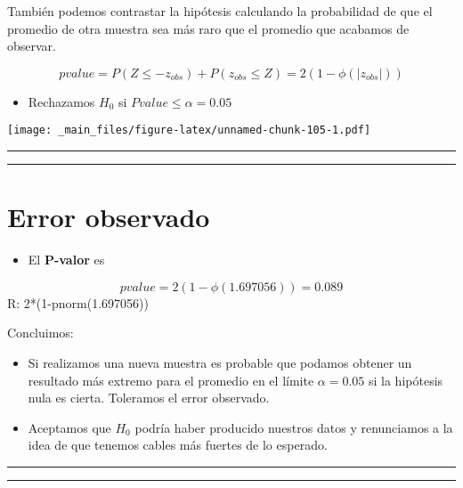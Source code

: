 \documentclass[
]{book}
\providecommand{\tightlist}{%
  \setlength{\itemsep}{0pt}\setlength{\parskip}{0pt}}
\begin{document}
También podemos contrastar la hipótesis calculando la probabilidad de que el promedio de otra muestra sea más raro que el promedio que acabamos de observar.

\[pvalue = P(Z \leq -z_{obs}) + P(z_{obs} \leq Z) = 2 (1-\phi(|z_{obs}|))\]

\begin{itemize}
\tightlist
\item
  Rechazamos \(H_0\) si \(Pvalue \leq \alpha =0.05\)
\end{itemize}

\texttt{[image: \_main\_files/figure-latex/unnamed-chunk-105-1.pdf]}

\begin{center}\rule{0.5\linewidth}{0.5pt}\end{center}

\begin{center}\rule{0.5\linewidth}{0.5pt}\end{center}

\hypertarget{error-observado}{%
\section{Error observado}\label{error-observado}}

\begin{itemize}
\tightlist
\item
  El \textbf{P-valor} es
\end{itemize}

\[pvalue=2 (1-\phi(1.697056))=0.089\]
R: 2*(1-pnorm(1.697056))

Concluimos:

\begin{itemize}
\item
  Si realizamos una nueva muestra es probable que podamos obtener un resultado más extremo para el promedio en el límite \(\alpha=0.05\) si la hipótesis nula es cierta. Toleramos el error observado.
\item
  Aceptamos que \(H_0\) podría haber producido nuestros datos y renunciamos a la idea de que tenemos cables más fuertes de lo esperado.
\end{itemize}

\begin{center}\rule{0.5\linewidth}{0.5pt}\end{center}

\begin{center}\rule{0.5\linewidth}{0.5pt}\end{center}
\end{document}
